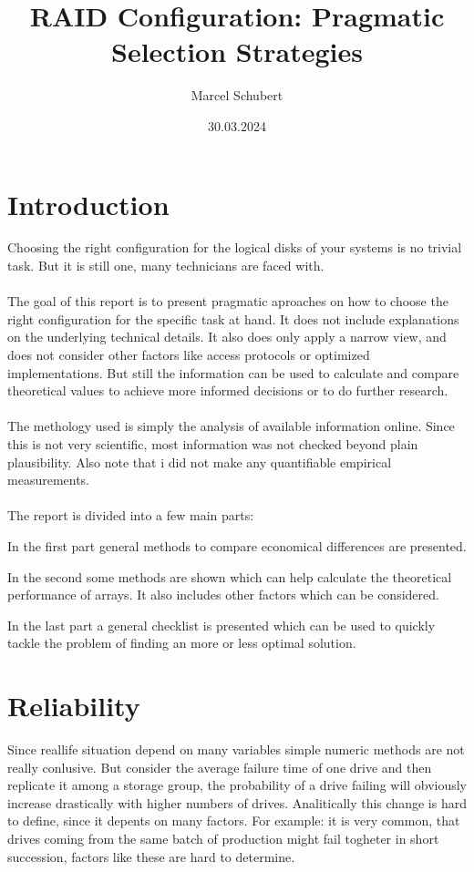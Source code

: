 \documentclass{article}
\title{RAID Configuration: Pragmatic Selection Strategies}
\author{Marcel Schubert}
\date{30.03.2024}
\begin{document}
\maketitle

\section*{Introduction}
Choosing the right configuration for the logical disks
of your systems is no trivial task. But it is still one, many technicians are faced with. 
\\ \\
The goal of this report is to present pragmatic aproaches on
how to choose the right configuration for the specific task at hand. 
It does not include explanations on the underlying technical details.
It also does only apply a narrow view, and does not consider 
other factors like access protocols or optimized implementations.
But still the information can be used to calculate and compare theoretical values
to achieve more informed decisions or to do further research.
\\ \\
The methology used is simply the analysis of available information online.
Since this is not very scientific, most information was
not checked beyond plain plausibility. Also note that i did not 
make any quantifiable empirical measurements.
\\ \\
The report is divided into a few main parts:

In the first part general methods to compare
economical differences are presented.

In the second some methods are shown which can help
calculate the theoretical performance of arrays.
It also includes other factors which can be considered.

In the last part a general checklist is presented which
can be used to quickly tackle the problem of finding an
more or less optimal solution.

\pagebreak
\tableofcontents
\pagebreak

\section{Reliability}
Since reallife situation depend on many
variables simple numeric methods are not really conlusive.
But consider the average failure time of one drive and then replicate it among
a storage group, the probability of a drive failing will obviously increase drastically
with higher numbers of drives. Analitically this change is hard to define,
since it depents on many factors. For example: it is very common,
that drives coming from the same batch of production might fail togheter
in short succession, factors like these are hard to determine. \cite{cmu:raidhighperf}
\end{document}

